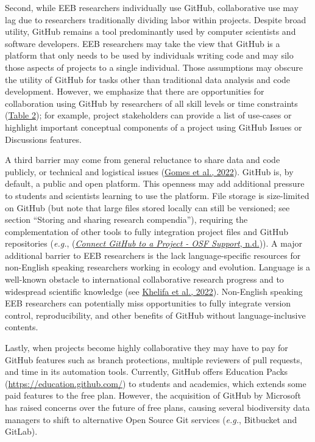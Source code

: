 Second, while EEB researchers individually use GitHub, collaborative use may lag due to researchers traditionally dividing labor within projects.
Despite broad utility, GitHub remains a tool predominantly used by computer scientists and software developers.
EEB researchers may take the view that GitHub is a platform that only needs to be used by individuals writing code and may silo those aspects of projects to a single individual.
Those assumptions may obscure the utility of GitHub for tasks other than traditional data analysis and code development.
However, we emphasize that there are opportunities for collaboration using GitHub by researchers of all skill levels or time constraints (\protect\hyperlink{tbl:roles}{Table 2}); for example, project stakeholders can provide a list of use-cases or highlight important conceptual components of a project using GitHub Issues or Discussions features.

A third barrier may come from general reluctance to share data and code publicly, or technical and logistical issues (\protect\hyperlink{ref-pq2Tv1BC}{Gomes et al., 2022}).
GitHub is, by default, a public and open platform.
This openness may add additional pressure to students and scientists learning to use the platform.
File storage is size-limited on GitHub (but note that large files stored locally can still be versioned; see section ``Storing and sharing research compendia''), requiring the complementation of other tools to fully integration project files and GitHub repositories (\emph{e.g.}, (\protect\hyperlink{ref-lx49NGto}{\emph{Connect GitHub to a Project - OSF Support}, n.d.})).
A major additional barrier to EEB researchers is the lack language-specific resources for non-English speaking researchers working in ecology and evolution.
Language is a well-known obstacle to international collaborative research progress and to widespread scientific knowledge (see \protect\hyperlink{ref-cW7vGddM}{Khelifa et al., 2022}).
Non-English speaking EEB researchers can potentially miss opportunities to fully integrate version control, reproducibility, and other benefits of GitHub without language-inclusive contents.

Lastly, when projects become highly collaborative they may have to pay for GitHub features such as branch protections, multiple reviewers of pull requests, and time in its automation tools.
Currently, GitHub offers Education Packs (\url{https://education.github.com/}) to students and academics, which extends some paid features to the free plan.
However, the acquisition of GitHub by Microsoft has raised concerns over the future of free plans, causing several biodiversity data managers to shift to alternative Open Source Git services (\emph{e.g.}, Bitbucket and GitLab).

